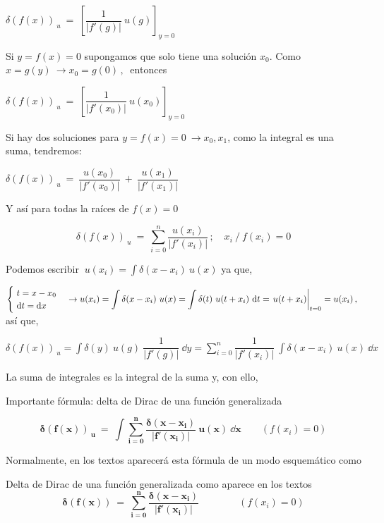$\delta (f(x))_{\ u} \ = \ \left[ \dfrac 1{|f'(g)|}\ u(g) \right]_{y=0}$

Si $y=f(x)=0$ supongamos que solo tiene una solución $x_0$. Como $x=g(y) \ \to x_0=g(0) \, , \  $ entonces

$\delta (f(x))_{\ u} \ = \ \left[ \dfrac 1{|f'(x_0)|}\ u(x_0) \right]_{y=0}$

Si hay dos soluciones para $y=f(x)=0 \ \to x_0, x_1$, como la integral es una suma, tendremos:

$\delta (f(x))_{\ u} \ = \  \dfrac {u(x_0)}{|f'(x_0)|} \ + \   \dfrac {u(x_1)}{|f'(x_1)|}$

Y así para todas la raíces de $f(x)=0$

$$\delta (f(x))_{\ u} \ = \ \displaystyle \sum_{i=0}^n  \dfrac {u(x_i)}{|f'(x_i)|} \, ; \quad x_i \  / \ f(x_i)=0 $$

Podemos escribir $\  u(x_i)=\displaystyle \int \delta(x-x_i) \ u(x)$ ya que,

$\begin{cases} \ t=x-x_0 \\ \ \dd t = \dd x \end{cases} \to \displaystyle u(x_i)=\int \delta(x-x_i) \ u(x) =\int \delta(t) \ u(t+x_i) \ \dd t = \eval{u(t+x_i)}_{t=0}=u(x_i)\, , \ $ así que,

$\delta (f(x))_{\ u} = \displaystyle \int \delta (y)\ u(g)\ \dfrac 1 {|f'(g)|}\ \dd y = \sum_{i=0}^n \dfrac 1 {|f'(x_i)|}\ \int \delta(x-x_i) \ u (x) \ \dd x$ 

La suma de integrales es la integral de la suma y, con ello, 

\begin{myblock}{Importante fórmula: delta de Dirac de una función generalizada}

\begin{large}
\begin{equation}
\label{T36TQCimpFmla}
\boldsymbol{
\delta(f(x))_{ \ u} \ = \ \displaystyle \int \sum_{i=0}^n \dfrac{\delta(x-x_i)}{|f'(x_i)|} \ u(x)\ \dd x	} \qquad \left( f(x_i)=0 \right)
\end{equation}
\end{large}
\end{myblock}

Normalmente, en los textos aparecerá esta fórmula de un modo esquemático como 

\begin{myalertblock}{Delta de Dirac de una función generalizada como aparece en los textos}
\begin{equation}
\label{T36TQCimpFmla-textos}	
\boldsymbol{
\delta(f(x)) \ = \ \displaystyle \sum_{i=0}^n \dfrac{\delta(x-x_i)}{|f'(x_i)|} 
} \qquad \qquad \left( f(x_i)=0 \right)
\end{equation}
\end{myalertblock}


